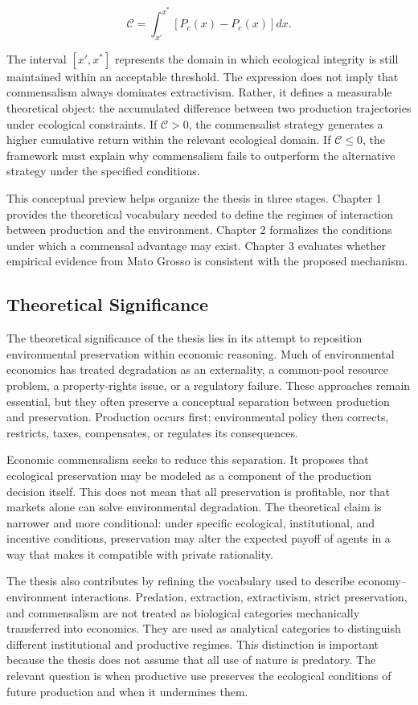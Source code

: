 \[
\mathcal{C} =
\int_{x'}^{x^*} \left[ P_c(x) - P_e(x) \right] dx.
\]

The interval \([x',x^*]\) represents the domain in which ecological integrity is still maintained within an acceptable threshold. The expression does not imply that commensalism always dominates extractivism. Rather, it defines a measurable theoretical object: the accumulated difference between two production trajectories under ecological constraints. If \(\mathcal{C} > 0\), the commensalist strategy generates a higher cumulative return within the relevant ecological domain. If \(\mathcal{C} \leq 0\), the framework must explain why commensalism fails to outperform the alternative strategy under the specified conditions.

This conceptual preview helps organize the thesis in three stages. Chapter 1 provides the theoretical vocabulary needed to define the regimes of interaction between production and the environment. Chapter 2 formalizes the conditions under which a commensal advantage may exist. Chapter 3 evaluates whether empirical evidence from Mato Grosso is consistent with the proposed mechanism.

\subsection{Theoretical Significance}

The theoretical significance of the thesis lies in its attempt to reposition environmental preservation within economic reasoning. Much of environmental economics has treated degradation as an externality, a common-pool resource problem, a property-rights issue, or a regulatory failure. These approaches remain essential, but they often preserve a conceptual separation between production and preservation. Production occurs first; environmental policy then corrects, restricts, taxes, compensates, or regulates its consequences.

Economic commensalism seeks to reduce this separation. It proposes that ecological preservation may be modeled as a component of the production decision itself. This does not mean that all preservation is profitable, nor that markets alone can solve environmental degradation. The theoretical claim is narrower and more conditional: under specific ecological, institutional, and incentive conditions, preservation may alter the expected payoff of agents in a way that makes it compatible with private rationality.

The thesis also contributes by refining the vocabulary used to describe economy--environment interactions. Predation, extraction, extractivism, strict preservation, and commensalism are not treated as biological categories mechanically transferred into economics. They are used as analytical categories to distinguish different institutional and productive regimes. This distinction is important because the thesis does not assume that all use of nature is predatory. The relevant question is when productive use preserves the ecological conditions of future production and when it undermines them.

